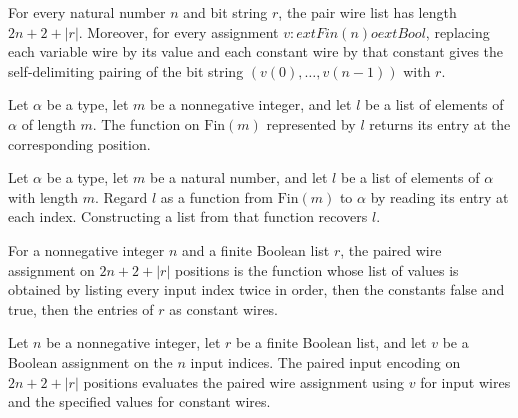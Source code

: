 \begin{theorem}
\label{BoolCircuit.pairWireList_spec}
\leanok
{}
For every natural number $n$ and bit string $r$, the pair wire list has length
$2n+2+|r|$. Moreover, for every assignment $v:	ext{Fin}(n)	o	ext{Bool}$, replacing each
variable wire by its value and each constant wire by that constant gives the
self-delimiting pairing of the bit string $(v(0),\ldots,v(n-1))$ with $r$.
\end{theorem}

\begin{definition}
\label{BoolCircuit.vectorOfList}
\leanok
Let $\alpha$ be a type, let $m$ be a nonnegative integer, and let $l$ be a list of
elements of $\alpha$ of length $m$. The function on $\text{Fin}(m)$ represented by $l$
returns its entry at the corresponding position.
\end{definition}

\begin{theorem}
\label{BoolCircuit.vectorOfList_ofFn}
\leanok
{}
Let $\alpha$ be a type, let $m$ be a natural number, and let $l$ be a list of elements of $\alpha$ with length $m$. Regard $l$ as a function from $\mathrm{Fin}(m)$ to $\alpha$ by reading its entry at each index. Constructing a list from that function recovers $l$.
\end{theorem}

\begin{definition}
\label{BoolCircuit.pairWiring}
\leanok
{}
For a nonnegative integer $n$ and a finite Boolean list $r$, the paired wire assignment
on $2n+2+|r|$ positions is the function whose list of values is obtained by listing
every input index twice in order, then the constants false and true, then the entries of
$r$ as constant wires.
\end{definition}

\begin{definition}
\label{BoolCircuit.pairEncodeInput}
\leanok
{}
Let $n$ be a nonnegative integer, let $r$ be a finite Boolean list, and let $v$ be a
Boolean assignment on the $n$ input indices. The paired input encoding on $2n+2+|r|$
positions evaluates the paired wire assignment using $v$ for input wires and the
specified values for constant wires.
\end{definition}

